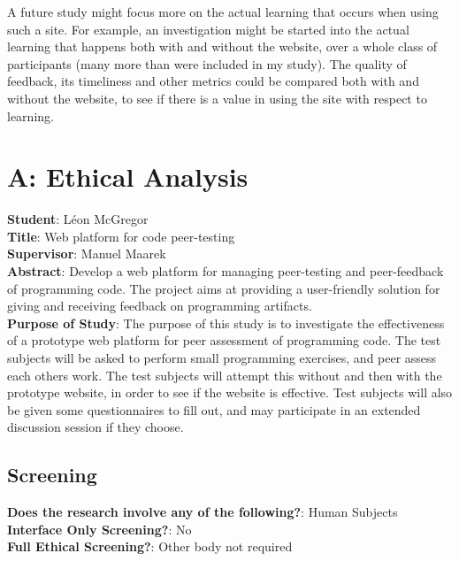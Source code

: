 \documentclass[a4paper,11pt]{report}
\begin{document}
A future study might focus more on the actual learning that occurs when using such a site. For example, an investigation might be started into the actual learning that happens both with and without the website, over a whole class of participants (many more than were included in my study). The quality of feedback, its timeliness and other metrics could be compared both with and without the website, to see if there is a value in using the site with respect to learning.

\pagebreak
{}
\singlespacing
\printbibliography
\pagebreak
{}

\section*{A: Ethical Analysis}
\label{app:ethical}
\textbf{Student}: L\'eon McGregor\\
\textbf{Title}: Web platform for code peer-testing\\
\textbf{Supervisor}: Manuel Maarek\\
\textbf{Abstract}: Develop a web platform for managing peer-testing and peer-feedback of programming code. The project aims at providing a user-friendly solution for giving and receiving feedback on programming artifacts.\\
\textbf{Purpose of Study}: The purpose of this study is to investigate the effectiveness of a prototype web platform for peer assessment of programming code. The test subjects will be asked to perform small programming exercises, and peer assess each others work. The test subjects will attempt this without and then with the prototype website, in order to see if the website is effective. Test subjects will also be given some questionnaires to fill out, and may participate in an extended discussion session if they choose.

\subsection*{Screening}
\textbf{Does the research involve any of the following?}: Human Subjects\\
\textbf{Interface Only Screening?}: No\\
\textbf{Full Ethical Screening?}: Other body not required
\end{document}

